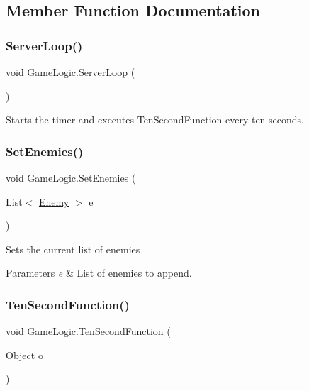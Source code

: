 \subsection{Member Function Documentation}
\mbox{\label{class_game_logic_aecfe8ccaaf740e73c68068f089b282a5}} 
\subsubsection{\texorpdfstring{ServerLoop()}{ServerLoop()}}
{\footnotesize\ttfamily void Game\+Logic.\+Server\+Loop (\begin{DoxyParamCaption}{ }\end{DoxyParamCaption})}



Starts the timer and executes Ten\+Second\+Function every ten seconds. 

\mbox{\label{class_game_logic_a3a11f40bd998b28362e0a1770d6ae3ba}} 
\subsubsection{\texorpdfstring{SetEnemies()}{SetEnemies()}}
{\footnotesize\ttfamily void Game\+Logic.\+Set\+Enemies (\begin{DoxyParamCaption}\item[{List$<$ \mbox{\hyperlink{class_enemy}{Enemy}} $>$}]{e }\end{DoxyParamCaption})}



Sets the current list of enemies 


\begin{DoxyParams}{Parameters}
{\em e} & List of enemies to append.\\
\hline
\end{DoxyParams}
\mbox{\label{class_game_logic_a8dff4358d9aa75a58a2bc8dcbea4453a}} 
\subsubsection{\texorpdfstring{TenSecondFunction()}{TenSecondFunction()}}
{\footnotesize\ttfamily void Game\+Logic.\+Ten\+Second\+Function (\begin{DoxyParamCaption}\item[{Object}]{o }\end{DoxyParamCaption})\hspace{0.3cm}{\ttfamily [private]}}



